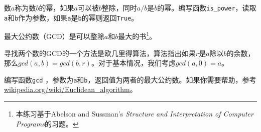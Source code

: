 \begin{ex}
数$a$称为数$b$的幂，如果$a$可以被$b$整除，同时$a/b$是$b$的幂。编写函数\verb"is_power"，读取{\tt a}和{\tt b}作为参数，如果{\tt a}是{\tt b}的幂则返回{\tt True}。
\end{ex}


\begin{ex}


最大公约数（GCD）是可以整除$a$和$b$最大的书\footnote{本练习基于Abelson and Sussman's {\em Structure and Interpretation of Computer Programs}的习题。}。

寻找两个数的GCD的一个方法是欧几里得算法，算法指出如果$r$是$a$除以$b$的余数，那么$gcd(a, b) = gcd(b, r)$。对于基本情况，我们考虑$gcd(a, 0) = a$。


编写函数\verb"gcd" ，参数为{\tt a}和{\tt b}，返回值为两者的最大公约数。如果你需要帮助，参考\url{wikipedia.org/wiki/Euclidean_algorithm}。

\end{ex}

